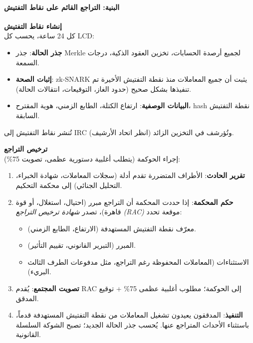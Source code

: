 \documentclass[11pt]{article}
\begin{document}
\paragraph{البنية: التراجع القائم على نقاط التفتيش}
\textbf{إنشاء نقاط التفتيش}\\
كل 24 ساعة، يحسب كل LCD:
\begin{itemize}[noitemsep]
  \item \textbf{جذر الحالة}: جذر Merkle لجميع أرصدة الحسابات، تخزين العقود الذكية، درجات السمعة.
  \item \textbf{إثبات الصحة}: zk-SNARK يثبت أن جميع المعاملات منذ نقطة التفتيش الأخيرة تم تنفيذها بشكل صحيح (حدود الغاز، التوقيعات، انتقالات الحالة).
  \item \textbf{البيانات الوصفية}: ارتفاع الكتلة، الطابع الزمني، هوية المقترح، hash نقطة التفتيش السابقة.
\end{itemize}
تُنشر نقاط التفتيش إلى IRC وتُؤرشف في التخزين الزائد (انظر اتحاد الأرشيف).

\textbf{ترخيص التراجع}\\
إجراء الحوكمة (يتطلب أغلبية دستورية عظمى، تصويت 75\%):
\begin{enumerate}[noitemsep]
  \item \textbf{تقرير الحادث}: الأطراف المتضررة تقدم أدلة (سجلات المعاملات، شهادة الخبراء، التحليل الجنائي) إلى محكمة التحكيم.
  \item \textbf{حكم المحكمة}: إذا حددت المحكمة أن التراجع مبرر (احتيال، استغلال، أو قوة قاهرة)، تصدر \emph{شهادة ترخيص التراجع (RAC)} موقعة تحدد:
    \begin{itemize}[noitemsep]
      \item معرّف نقطة التفتيش المستهدفة (الارتفاع، الطابع الزمني).
      \item المبرر (التبرير القانوني، تقييم التأثير).
      \item الاستثناءات (المعاملات المحفوظة رغم التراجع، مثل مدفوعات الطرف الثالث البريء).
    \end{itemize}
  \item \textbf{تصويت المجتمع}: يُقدم RAC إلى الحوكمة؛ مطلوب أغلبية عظمى 75\% + توقيع المدقق.
  \item \textbf{التنفيذ}: المدققون يعيدون تشغيل المعاملات من نقطة التفتيش المستهدفة قدماً، باستثناء الأحداث المتراجع عنها. يُحسب جذر الحالة الجديد؛ تصبح الشوكة السلسلة القانونية.
\end{enumerate}
\end{document}
